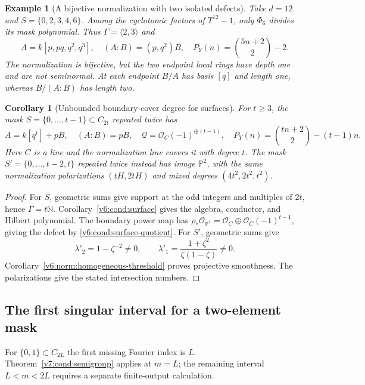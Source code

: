 \documentclass[10pt,fleqn]{article}
\numberwithin{equation}{section}
\newtheorem{corollary}[theorem]{Corollary}
\newtheorem{example}[theorem]{Example}
\newcommand{\PP}{\mathbb P}
\begin{document}
\begin{example}[A bijective normalization with two isolated defects]
\label{v6:cond:isolated}
Take $d=12$ and $S=\{0,2,3,4,6\}$.  Among the cyclotomic factors of
$T^{12}-1$, only $\Phi_6$ divides its mask polynomial.  Thus
$\Gamma=\langle2,3\rangle$ and
\[
 A=k[p,pq,q^2,q^3],\quad(A:B)=(p,q^2)B,\quad
 P_Y(n)=\binom{5n+2}{2}-2.
\]
The normalization is bijective, but the two endpoint local rings have
depth one and are not seminormal.  At each endpoint $B/A$ has basis
$[q]$ and length one, whereas $B/(A:B)$ has length two.
\end{example}

\begin{corollary}[Unbounded boundary-cover degree for surfaces]
\label{v6:cond:halfmask}
For $t\ge3$, the mask $S=\{0,\ldots,t-1\}\subset C_{2t}$ repeated twice
has
\[
 A=k[q^t]+pB,\quad(A:B)=pB,\quad
 \mathcal Q=\mathcal O_C(-1)^{\oplus(t-1)},\quad
 P_Y(n)=\binom{tn+2}{2}-(t-1)n.
\]
Here $C$ is a line and the normalization line covers it with degree $t$.
The mask $S'=\{0,\ldots,t-2,t\}$ repeated twice instead has image $\PP^2$,
with the same normalization polarizations $(tH,2tH)$ and mixed degrees
$(4t^2,2t^2,t^2)$.
\end{corollary}
\begin{proof}
For $S$, geometric sums give support at the odd integers and multiples
of $2t$, hence $\Gamma=t\mathbb N$.  Corollary~\ref{v6:cond:surface}
gives the algebra, conductor, and Hilbert polynomial.  The boundary power
map has $\rho_*\mathcal O_{\PP^1}=\mathcal O_C\oplus
\mathcal O_C(-1)^{t-1}$, giving the defect by
\eqref{v6:cond:surface-quotient}.  For $S'$, geometric sums give
\[
 \lambda'_2=1-\zeta^{-2}\ne0,\qquad
 \lambda'_1=\frac{1+\zeta^2}{\zeta(1-\zeta)}\ne0.
\]
Corollary~\ref{v6:norm:homogeneous-threshold} proves projective smoothness.
The polarizations give the stated intersection numbers.
\end{proof}

\subsection{The first singular interval for a two-element mask}
\label{r21:cond:interval-route}

For $\{0,1\}\subset C_{2L}$ the first missing Fourier index is $L$.
Theorem~\ref{v7:cond:semigroup} applies at $m=L$; the remaining interval
$L<m<2L$ requires a separate finite-output calculation.
\end{document}
